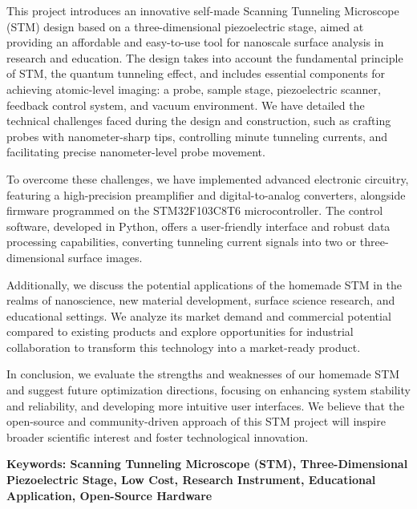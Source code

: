 \documentclass{article}
\begin{document}
\begin{adjustwidth}{0.42cm}{0.42cm}
	\qquad This project introduces an innovative self-made Scanning Tunneling Microscope (STM) design based on a three-dimensional piezoelectric stage, aimed at providing an affordable and easy-to-use tool for nanoscale surface analysis in research and education. The design takes into account the fundamental principle of STM, the quantum tunneling effect, and includes essential components for achieving atomic-level imaging: a probe, sample stage, piezoelectric scanner, feedback control system, and vacuum environment. We have detailed the technical challenges faced during the design and construction, such as crafting probes with nanometer-sharp tips, controlling minute tunneling currents, and facilitating precise nanometer-level probe movement.

	To overcome these challenges, we have implemented advanced electronic
	circuitry, featuring a high-precision preamplifier and digital-to-analog
	converters, alongside firmware programmed on the STM32F103C8T6 microcontroller.
	The control software, developed in Python, offers a user-friendly interface and
	robust data processing capabilities, converting tunneling current signals into
	two or three-dimensional surface images.

	Additionally, we discuss the potential applications of the homemade STM in the
	realms of nanoscience, new material development, surface science research, and
	educational settings. We analyze its market demand and commercial potential
	compared to existing products and explore opportunities for industrial
	collaboration to transform this technology into a market-ready product.

	In conclusion, we evaluate the strengths and weaknesses of our homemade STM and
	suggest future optimization directions, focusing on enhancing system stability
	and reliability, and developing more intuitive user interfaces. We believe that
	the open-source and community-driven approach of this STM project will inspire
	broader scientific interest and foster technological innovation.

	\textbf{Keywords: Scanning Tunneling Microscope (STM), Three-Dimensional Piezoelectric Stage, Low Cost, Research Instrument, Educational Application, Open-Source Hardware}
\end{adjustwidth}


\clearpage
\end{document}
